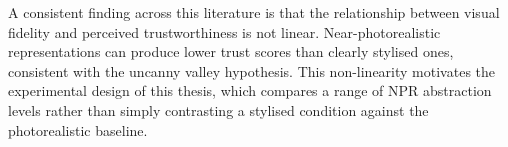 A consistent finding across this literature is that the relationship between visual fidelity and perceived trustworthiness is not linear. Near-photorealistic representations can produce lower trust scores than clearly stylised ones, consistent with the uncanny valley hypothesis. This non-linearity motivates the experimental design of this thesis, which compares a range of NPR abstraction levels rather than simply contrasting a stylised condition against the photorealistic baseline.
